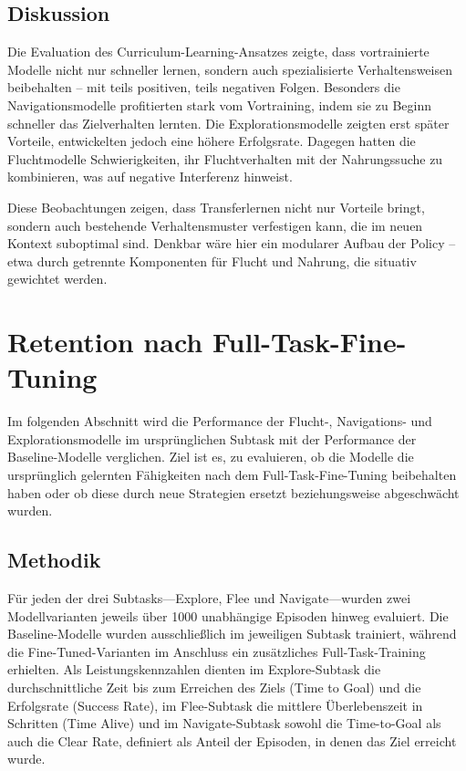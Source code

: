 \subsection{Diskussion}

Die Evaluation des Curriculum-Learning-Ansatzes zeigte, dass vortrainierte Modelle nicht nur schneller lernen, sondern auch spezialisierte Verhaltensweisen beibehalten – mit teils positiven, teils negativen Folgen. Besonders die Navigationsmodelle profitierten stark vom Vortraining, indem sie zu Beginn schneller das Zielverhalten lernten. Die Explorationsmodelle zeigten erst später Vorteile, entwickelten jedoch eine höhere Erfolgsrate. Dagegen hatten die Fluchtmodelle Schwierigkeiten, ihr Fluchtverhalten mit der Nahrungssuche zu kombinieren, was auf negative Interferenz hinweist.

Diese Beobachtungen zeigen, dass Transferlernen nicht nur Vorteile bringt, sondern auch bestehende Verhaltensmuster verfestigen kann, die im neuen Kontext suboptimal sind. Denkbar wäre hier ein modularer Aufbau der Policy – etwa durch getrennte Komponenten für Flucht und Nahrung, die situativ gewichtet werden.

\section{Retention nach Full-Task-Fine-Tuning}
Im folgenden Abschnitt wird die Performance der Flucht-, Navigations- und Explorationsmodelle im ursprünglichen Subtask mit der Performance der Baseline-Modelle verglichen. Ziel ist es, zu evaluieren, ob die Modelle die ursprünglich gelernten Fähigkeiten nach dem Full-Task-Fine-Tuning beibehalten haben oder ob diese durch neue Strategien ersetzt beziehungsweise abgeschwächt wurden.

\subsection{Methodik}
Für jeden der drei Subtasks—Explore, Flee und Navigate—wurden zwei Modellvarianten jeweils über 1000 unabhängige Episoden hinweg evaluiert. Die Baseline-Modelle wurden ausschließlich im jeweiligen Subtask trainiert, während die Fine-Tuned-Varianten im Anschluss ein zusätzliches Full-Task-Training erhielten. Als Leistungskennzahlen dienten im Explore-Subtask die durchschnittliche Zeit bis zum Erreichen des Ziels (Time to Goal) und die Erfolgsrate (Success Rate), im Flee-Subtask die mittlere Überlebenszeit in Schritten (Time Alive) und im Navigate-Subtask sowohl die Time-to-Goal als auch die Clear Rate, definiert als Anteil der Episoden, in denen das Ziel erreicht wurde.

